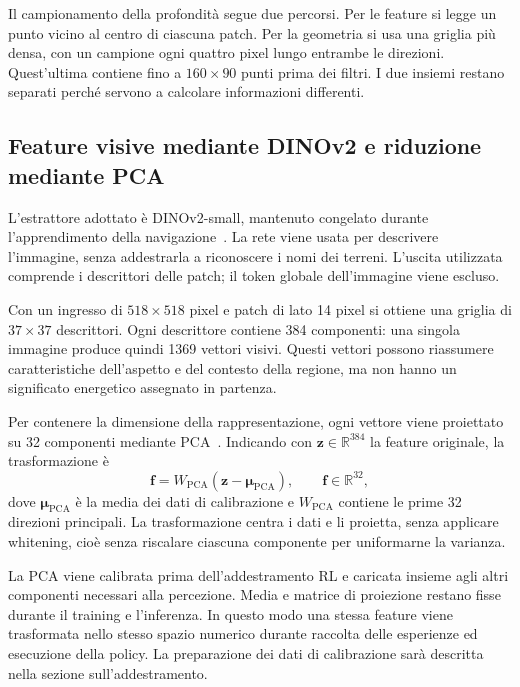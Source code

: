Il campionamento della profondità segue due percorsi. Per le feature si legge un punto vicino al centro di ciascuna patch. Per la geometria si usa una griglia più densa, con un campione ogni quattro pixel lungo entrambe le direzioni. Quest'ultima contiene fino a $160\times90$ punti prima dei filtri. I due insiemi restano separati perché servono a calcolare informazioni differenti.

\subsection{Feature visive mediante DINOv2 e riduzione mediante PCA}

L'estrattore adottato è DINOv2-small, mantenuto congelato durante l'apprendimento della navigazione~\citep{Oquab2023DINOv2}. La rete viene usata per descrivere l'immagine, senza addestrarla a riconoscere i nomi dei terreni. L'uscita utilizzata comprende i descrittori delle patch; il token globale dell'immagine viene escluso.

Con un ingresso di $518\times518$ pixel e patch di lato 14 pixel si ottiene una griglia di $37\times37$ descrittori. Ogni descrittore contiene 384 componenti: una singola immagine produce quindi 1369 vettori visivi. Questi vettori possono riassumere caratteristiche dell'aspetto e del contesto della regione, ma non hanno un significato energetico assegnato in partenza.

Per contenere la dimensione della rappresentazione, ogni vettore viene proiettato su 32 componenti mediante PCA~\citep{Jolliffe2016PCA}. Indicando con $\mathbf z\in\mathbb R^{384}$ la feature originale, la trasformazione è
\begin{equation}
    \mathbf f=W_{\mathrm{PCA}}
                    (\mathbf z-\boldsymbol\mu_{\mathrm{PCA}}),
    \qquad \mathbf f\in\mathbb R^{32},
    \label{eq:metodo-feature-pca}
\end{equation}
dove $\boldsymbol\mu_{\mathrm{PCA}}$ è la media dei dati di calibrazione e $W_{\mathrm{PCA}}$ contiene le prime 32 direzioni principali. La trasformazione centra i dati e li proietta, senza applicare whitening, cioè senza riscalare ciascuna componente per uniformarne la varianza.

La PCA viene calibrata prima dell'addestramento RL e caricata insieme agli altri componenti necessari alla percezione. Media e matrice di proiezione restano fisse durante il training e l'inferenza. In questo modo una stessa feature viene trasformata nello stesso spazio numerico durante raccolta delle esperienze ed esecuzione della policy. La preparazione dei dati di calibrazione sarà descritta nella sezione sull'addestramento.

